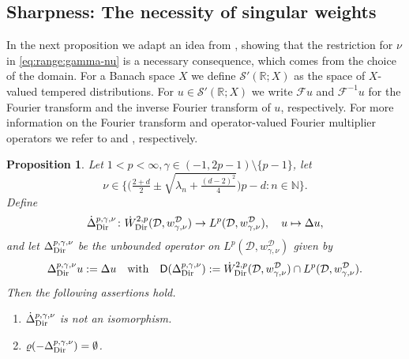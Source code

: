 \documentclass[12pt,a4paper, reqno]{amsart}
\theoremstyle{plain}
\newtheorem{proposition}[theorem]{Proposition}
\theoremstyle{definition}
\theoremstyle{remark}
\numberwithin{equation}{section}
\newcommand{\1}{\mathbbm{1}}
\newcommand{\R}{\ensuremath{\mathbb{R}}}
\newcommand{\N}{\ensuremath{\mathbb{N}}}
\newcommand{\calD}{\ensuremath{\mathcal{D}}}
\newcommand{\sF}{\ensuremath{\mathscr{F}}}
\newcommand{\sS}{\ensuremath{\mathscr{S}}}
\newcommand{\sfD}{\ensuremath{\mathsf{D}}}
\newcommand{\Dir}{\textup{Dir}}
\begin{document}
\subsection{Sharpness: The necessity of singular weights}
In the next proposition we adapt an idea from \cite{KoehneSaalWestermann2021}, showing that the restriction for $\nu$ in \eqref{eq:range:gamma-nu} is a necessary consequence, which comes from the choice of the domain.
For a Banach space $X$ we define $\sS'(\R;X)$ as the space of $X$-valued tempered distributions. For $u\in \sS'(\R;X)$ we write $\sF u$ and $\sF^{-1}u$ for the Fourier transform and the inverse Fourier transform of $u$, respectively. 
For more information on the Fourier transform and  operator-valued Fourier multiplier operators we refer to \cite[Section~2.4]{aibs1} and \cite[Section~4.3]{PrssSimonett2016}, respectively. 
\begin{proposition}\label{prop:counterexample}
    Let $1<p<\infty, \gamma\in (-1,2p-1)\setminus\{p-1\}$, let 
    \[\nu\in \Big\{\Big(\tfrac{2+d}{2}\pm \sqrt{\lambda_n+\tfrac{(d-2)^2}{4}}\Big)p-d\colon n\in\N\Big\}.\]
    Define 
    \[
    \Dot \Delta_\Dir^{p,\gamma,\nu}\colon \Dot W^{2,p}_\Dir(\calD,w_{\gamma,\nu}^\calD)\to L^p(\calD,w_{\gamma,\nu}^\calD), \quad u\mapsto \Delta u,
    \]
    and let $\Delta_\Dir^{p,\gamma,\nu}$ be the unbounded operator on $L^p(\calD,w_{\gamma,\nu}^\calD)$ given by 
\[\Delta_\Dir^{p,\gamma,\nu}u:=\Delta u \quad \text{with}\quad \sfD(\Delta_\Dir^{p,\gamma,\nu}):=\Dot W^{2,p}_\Dir(\calD,w_{\gamma,\nu}^\calD)\cap L^p(\calD,w_{\gamma,\nu}^\calD).   \]
Then the following assertions hold.

\begin{enumerate}[label=\textup{(\roman*)}]
    \item\label{it:counterexample:1} $\displaystyle\Dot\Delta_\Dir^{p,\gamma,\nu}$ is not an isomorphism.
    \item\label{it:counterexample:2} $\displaystyle\varrho(-\Delta_\Dir^{p,\gamma,\nu})=\emptyset$. 
\end{enumerate}
\end{proposition}
\end{document}
